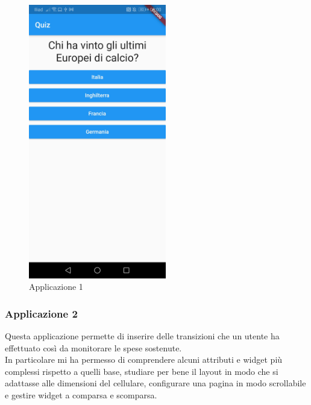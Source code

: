 \begin{figure}[htbp]	
	\centering
	\includegraphics[width=6cm]{immagini/app1.jpeg}
	\caption{Applicazione 1}
	\label{fig:Applicazione 1}
\end{figure}

\newpage

\subsubsection{Applicazione 2}
Questa applicazione permette di inserire delle transizioni che un utente ha effettuato così da monitorare le spese sostenute.\\
In particolare mi ha permesso di comprendere alcuni attributi e widget più complessi rispetto a quelli base, studiare per bene il layout in modo che si adattasse alle dimensioni del cellulare, configurare una pagina in modo scrollabile e gestire widget a comparsa e scomparsa.\\

